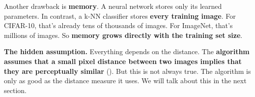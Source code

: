 \highspace
Another drawback is \textbf{memory}. A neural network stores only its learned parameters. In contrast, a k-NN classifier stores \textbf{every training image}. For CIFAR-10, that's already tens of thousands of images. For ImageNet, that's millions of images. So \textbf{memory grows directly with the training set size}.

\highspace
\textcolor{Red2}{ \textbf{The hidden assumption.}} Everything depends on the distance. The \textbf{algorithm assumes that a small pixel distance between two images implies that they are perceptually similar} (). But this is not always true. The algorithm is only as good as the distance measure it uses. We will talk about this in the next section.